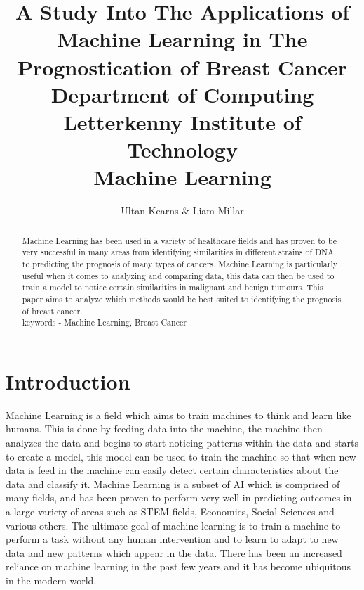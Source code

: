 \documentclass[conference]{IEEEtran}
\begin{document}
\title{
A Study Into The Applications of Machine Learning in The Prognostication of Breast Cancer\\
\vspace{5mm}
\large Department of Computing \\
\vspace{3mm} 
\large Letterkenny Institute of Technology \\
\vspace{3mm} 
\large Machine Learning
}
\vspace{3mm}  
\author{Ultan Kearns \& Liam Millar}
\maketitle
\begin{abstract}
    Machine Learning has been used in a variety of healthcare fields and has proven to be very successful in many areas from identifying similarities in different strains of DNA to predicting the prognosis of many types of cancers.  Machine Learning is particularly useful when it comes to analyzing and comparing data, this data can then be used to train a model to notice certain similarities in malignant and benign tumours.  This paper aims to analyze which methods would be best suited to identifying the prognosis of breast cancer.\\
    keywords - Machine Learning, Breast Cancer
\end{abstract}

\section{Introduction}
Machine Learning is a field which aims to train machines to think and learn like humans.  This is done by feeding data into the machine, the machine then analyzes the data and begins to start noticing patterns within the data and starts to create a model, this model can be used to train the machine so that when new data is feed in the machine can easily detect certain characteristics about the data and classify it.  Machine Learning is a subset of AI which is comprised of many fields, and has been proven to perform very well in predicting outcomes in a large variety of areas such as STEM fields, Economics, Social Sciences and various others.  The ultimate goal of machine learning is to train a machine to perform a task without any human intervention and to learn to adapt to new data and new patterns which appear in the data.  There has been an increased reliance on machine learning in the past few years and it has become ubiquitous in the modern world.\\
\end{document}
